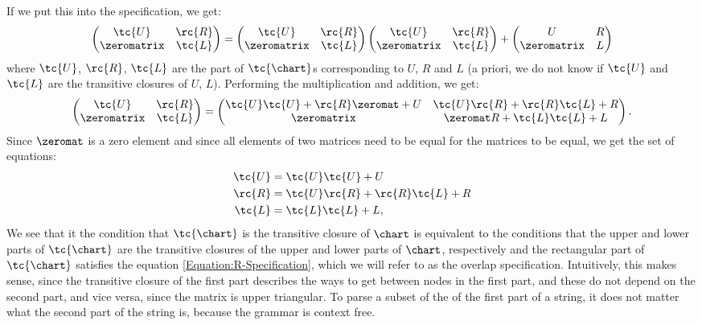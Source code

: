 If we put this into the specification, we get:
\begin{equation*}
  \begin{pmatrix}
    \tc{U} & \rc{R} \\
    \zeromatrix   & \tc{L}
  \end{pmatrix}
  =  
  \begin{pmatrix}
    \tc{U} & \rc{R} \\
    \zeromatrix   & \tc{L}
  \end{pmatrix}
  \begin{pmatrix}
    \tc{U} & \rc{R} \\
    \zeromatrix   & \tc{L}
  \end{pmatrix}
  +
  \begin{pmatrix}
    U & R \\
    \zeromatrix & L
  \end{pmatrix}
\end{equation*}
where $\tc{U}$, $\rc{R}$, $\tc{L}$ are the part of $\tc{\chart}$s corresponding to $U$, $R$ and $L$ (a priori, we do not know if $\tc{U}$ and $\tc{L}$ are the transitive closures of $U$, $L$). Performing the multiplication and addition, we get:
\begin{equation*}
    \begin{pmatrix}
    \tc{U} & \rc{R} \\
    \zeromatrix   & \tc{L}
  \end{pmatrix} 
    =
  \begin{pmatrix}
    \tc{U}\tc{U} + \rc{R}\zeromat + U   &   \tc{U}\rc{R}     + \rc{R}\tc{L} + R \\
    \zeromatrix                          &   \zeromat R + \tc{L}\tc{L} + L
  \end{pmatrix}.
\end{equation*}
Since $\zeromat$ is a zero element and since all elements of two matrices need to be equal for the matrices to be equal, we get the set of equations:
\begin{align}
  \tc{U} &= \tc{U}\tc{U} + U \\
  \rc{R} &= \tc{U}\rc{R} + \rc{R}\tc{L} + R \label{Equation:R-Specification}\\
  \tc{L} &= \tc{L}\tc{L} + L,
\end{align}
We see that it the condition that $\tc{\chart}$ is the transitive closure of $\chart$ is equivalent to the conditions that the upper and lower parts of $\tc{\chart}$ are the transitive closures of the upper and lower parts of $\chart$, respectively and the rectangular part of $\tc{\chart}$ satisfies the equation \eqref{Equation:R-Specification}, which we will refer to as the overlap specification. Intuitively, this makes sense, since the transitive closure of the first part describes the ways to get between nodes in the first part, and these do not depend on the second part, and vice versa, since the matrix is upper triangular. To parse a subset of the of the first part of a string, it does not matter what the second part of the string is, because the grammar is context free.
